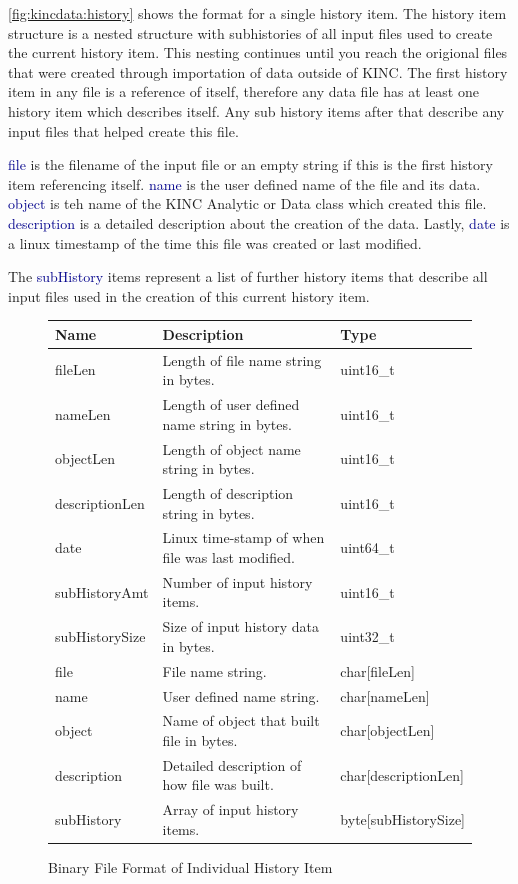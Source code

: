 \documentclass[10pt]{article}
\providecommand{\h}[1]{\textcolor{darkblue}{#1}}
\begin{document}
\autoref{fig:kincdata:history} shows the format for a single history item. The 
history item structure is a nested structure with subhistories of all input 
files used to create the current history item. This nesting continues until you 
reach the origional files that were created through importation of data outside 
of KINC. The first history item in any file is a reference of itself, therefore 
any data file has at least one history item which describes itself. Any sub 
history items after that describe any input files that helped create this file.

\h{file} is the filename of the input file or an empty string if this is the 
first history item referencing itself. \h{name} is the user defined name of the 
file and its data. \h{object} is teh name of the KINC Analytic or Data class 
which created this file. \h{description} is a detailed description about the 
creation of the data. Lastly, \h{date} is a linux timestamp of the time this 
file was created or last modified.

The \h{subHistory} items represent a list of further history items that 
describe all input files used in the creation of this current history item.

\begin{figure}[H]
\begin{mdframed}[style=btable]
\begin{tabularx}{\textwidth}{|l|X|l|}
\hline
\textbf{Name} & \textbf{Description} & \textbf{Type} \\
\hline
fileLen & Length of file name string in bytes. & uint16\_t \\
\hline
nameLen & Length of user defined name string in bytes. & uint16\_t \\
\hline
objectLen & Length of object name string in bytes. & uint16\_t \\
\hline
descriptionLen & Length of description string in bytes. & uint16\_t \\
\hline
date & Linux time-stamp of when file was last modified. & uint64\_t \\
\hline
subHistoryAmt & Number of input history items. & uint16\_t \\
\hline
subHistorySize & Size of input history data in bytes. & uint32\_t \\
\hline
file & File name string. & char[fileLen] \\
\hline
name & User defined name string. & char[nameLen] \\
\hline
object & Name of object that built file in bytes. & char[objectLen] \\
\hline
description & Detailed description of how file was built. & 
char[descriptionLen] \\
\hline
subHistory & Array of input history items. & byte[subHistorySize] \\
\hline
\end{tabularx}
\end{mdframed}
\caption{Binary File Format of Individual History Item}
\label{fig:kincdata:history}
\end{figure}
\end{document}
